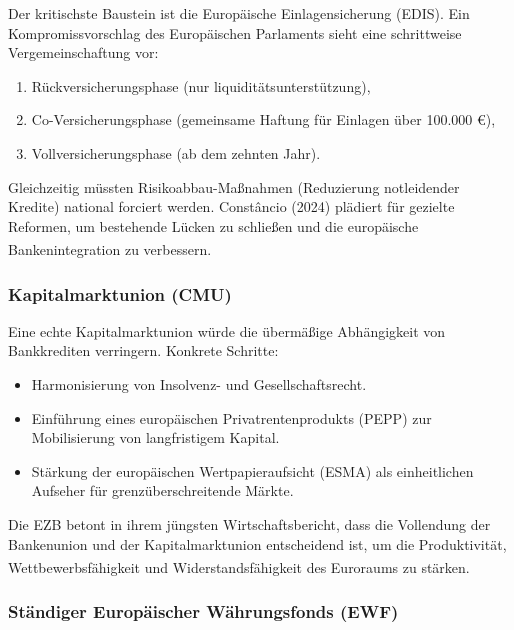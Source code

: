 \documentclass[12pt,a4paper]{article}
\newcommand{\footcite}[1]{\textsuperscript{\cite{#1}}}
\begin{document}
	Der kritischste Baustein ist die Europäische Einlagensicherung (EDIS). Ein Kompromissvorschlag des Europäischen Parlaments sieht eine schrittweise Vergemeinschaftung vor:
	\begin{enumerate}
		\item Rückversicherungsphase (nur liquiditätsunterstützung),
		\item Co-Versicherungsphase (gemeinsame Haftung für Einlagen über 100.000 €),
		\item Vollversicherungsphase (ab dem zehnten Jahr).
	\end{enumerate}
	Gleichzeitig müssten Risikoabbau-Maßnahmen (Reduzierung notleidender Kredite) national forciert werden. Constâncio (2024) plädiert für gezielte Reformen, um bestehende Lücken zu schließen und die europäische Bankenintegration zu verbessern.\footcite{Constancio2024}
	
	\subsubsection{Kapitalmarktunion (CMU)}
	
	Eine echte Kapitalmarktunion würde die übermäßige Abhängigkeit von Bankkrediten verringern. Konkrete Schritte:
	\begin{itemize}
		\item Harmonisierung von Insolvenz- und Gesellschaftsrecht.
		\item Einführung eines europäischen Privatrentenprodukts (PEPP) zur Mobilisierung von langfristigem Kapital.
		\item Stärkung der europäischen Wertpapieraufsicht (ESMA) als einheitlichen Aufseher für grenzüberschreitende Märkte.
	\end{itemize}
	Die EZB betont in ihrem jüngsten Wirtschaftsbericht, dass die Vollendung der Bankenunion und der Kapitalmarktunion entscheidend ist, um die Produktivität, Wettbewerbsfähigkeit und Widerstandsfähigkeit des Euroraums zu stärken.\footcite{ECBBulletin2025}
	
	\subsubsection{Ständiger Europäischer Währungsfonds (EWF)}
	
\end{document}
